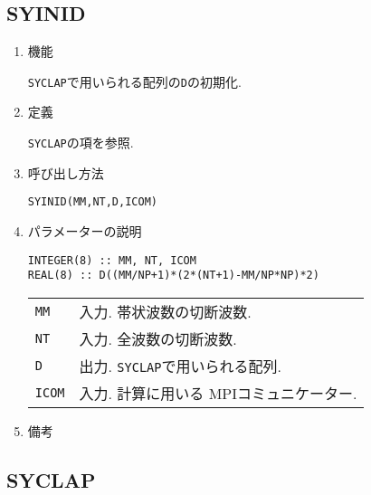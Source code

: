 \documentclass[a4j]{jsarticle}
\begin{document}
\subsection{SYINID}

\begin{enumerate}

\item 機能 

\texttt{SYCLAP}で用いられる配列の\texttt{D}の初期化.

\item 定義

\texttt{SYCLAP}の項を参照.

\item 呼び出し方法 

\texttt{SYINID(MM,NT,D,ICOM)}
  
\item パラメーターの説明

\begin{verbatim}
INTEGER(8) :: MM, NT, ICOM
REAL(8) :: D((MM/NP+1)*(2*(NT+1)-MM/NP*NP)*2)
\end{verbatim}

\begin{tabular}{ll}
\texttt{MM} & 入力. 帯状波数の切断波数.\\  
\texttt{NT} & 入力. 全波数の切断波数.\\
\texttt{D} & 出力. \texttt{SYCLAP}で用いられる配列.\\
\texttt{ICOM} & 入力. 計算に用いる MPIコミュニケーター.
\end{tabular}

\item 備考
    
\end{enumerate}


\subsection{SYCLAP}
\end{document}
